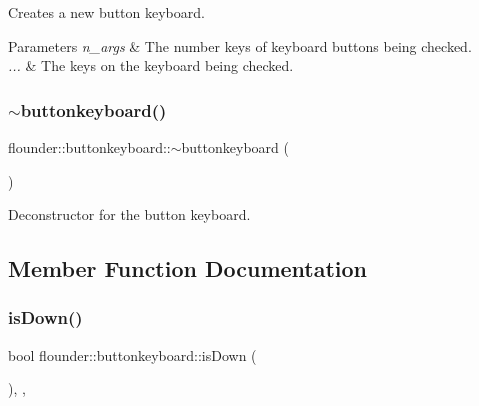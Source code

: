 Creates a new button keyboard. 


\begin{DoxyParams}{Parameters}
{\em n\+\_\+args} & The number keys of keyboard buttons being checked. \\
\hline
{\em ...} & The keys on the keyboard being checked. \\
\hline
\end{DoxyParams}
\mbox{\label{classflounder_1_1buttonkeyboard_a76e965d16462442aaae33fe6fd2421ea}} 
\subsubsection{\texorpdfstring{$\sim$buttonkeyboard()}{~buttonkeyboard()}}
{\footnotesize\ttfamily flounder\+::buttonkeyboard\+::$\sim$buttonkeyboard (\begin{DoxyParamCaption}{ }\end{DoxyParamCaption})\hspace{0.3cm}{\ttfamily [inline]}}



Deconstructor for the button keyboard. 



\subsection{Member Function Documentation}
\mbox{\label{classflounder_1_1buttonkeyboard_a432555049251cec48431e4f14b6aa34b}} 
\subsubsection{\texorpdfstring{is\+Down()}{isDown()}}
{\footnotesize\ttfamily bool flounder\+::buttonkeyboard\+::is\+Down (\begin{DoxyParamCaption}{ }\end{DoxyParamCaption})\hspace{0.3cm}{\ttfamily [inline]}, {\ttfamily [override]}, {\ttfamily [virtual]}}



